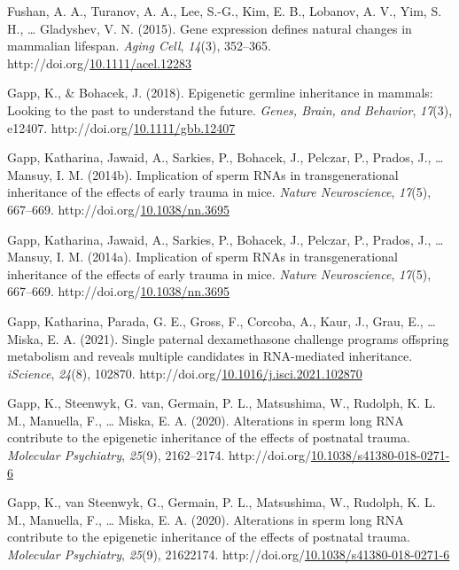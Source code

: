 \documentclass[12pt,twoside]{reedthesis}
\newlength{\cslhangindent}
\newenvironment{CSLReferences}[2] %
 {%
  \setlength{\parindent}{0pt}
  \ifodd #1 \everypar{\setlength{\hangindent}{\cslhangindent}}\ignorespaces\fi
  \ifnum #2 > 0
  \setlength{\parskip}{#2\baselineskip}
  \fi
 }%
 {}
\begin{document}
\begin{CSLReferences}{1}{0}
\leavevmode{}%
Fushan, A. A., Turanov, A. A., Lee, S.-G., Kim, E. B., Lobanov, A. V., Yim, S. H., \ldots{} Gladyshev, V. N. (2015). Gene expression defines natural changes in mammalian lifespan. \emph{Aging Cell}, \emph{14}(3), 352--365. http://doi.org/\href{https://doi.org/10.1111/acel.12283}{10.1111/acel.12283}

\leavevmode{}%
Gapp, K., \& Bohacek, J. (2018). Epigenetic germline inheritance in mammals: Looking to the past to understand the future. \emph{Genes, Brain, and Behavior}, \emph{17}(3), e12407. http://doi.org/\href{https://doi.org/10.1111/gbb.12407}{10.1111/gbb.12407}

\leavevmode{}%
Gapp, Katharina, Jawaid, A., Sarkies, P., Bohacek, J., Pelczar, P., Prados, J., \ldots{} Mansuy, I. M. (2014b). Implication of sperm {RNAs} in transgenerational inheritance of the effects of early trauma in mice. \emph{Nature Neuroscience}, \emph{17}(5), 667--669. http://doi.org/\href{https://doi.org/10.1038/nn.3695}{10.1038/nn.3695}

\leavevmode{}%
Gapp, Katharina, Jawaid, A., Sarkies, P., Bohacek, J., Pelczar, P., Prados, J., \ldots{} Mansuy, I. M. (2014a). Implication of sperm RNAs in transgenerational inheritance of the effects of early trauma in mice. \emph{Nature Neuroscience}, \emph{17}(5), 667--669. http://doi.org/\href{https://doi.org/10.1038/nn.3695}{10.1038/nn.3695}

\leavevmode{}%
Gapp, Katharina, Parada, G. E., Gross, F., Corcoba, A., Kaur, J., Grau, E., \ldots{} Miska, E. A. (2021). Single paternal dexamethasone challenge programs offspring metabolism and reveals multiple candidates in RNA-mediated inheritance. \emph{iScience}, \emph{24}(8), 102870. http://doi.org/\href{https://doi.org/10.1016/j.isci.2021.102870}{10.1016/j.isci.2021.102870}

\leavevmode{}%
Gapp, K., Steenwyk, G. van, Germain, P. L., Matsushima, W., Rudolph, K. L. M., Manuella, F., \ldots{} Miska, E. A. (2020). Alterations in sperm long {RNA} contribute to the epigenetic inheritance of the effects of postnatal trauma. \emph{Molecular Psychiatry}, \emph{25}(9), 2162--2174. http://doi.org/\href{https://doi.org/10.1038/s41380-018-0271-6}{10.1038/s41380-018-0271-6}

\leavevmode{}%
Gapp, K., van Steenwyk, G., Germain, P. L., Matsushima, W., Rudolph, K. L. M., Manuella, F., \ldots{} Miska, E. A. (2020). Alterations in sperm long RNA contribute to the epigenetic inheritance of the effects of postnatal trauma. \emph{Molecular Psychiatry}, \emph{25}(9), 21622174. http://doi.org/\href{https://doi.org/10.1038/s41380-018-0271-6}{10.1038/s41380-018-0271-6}


\end{CSLReferences}
\end{document}
